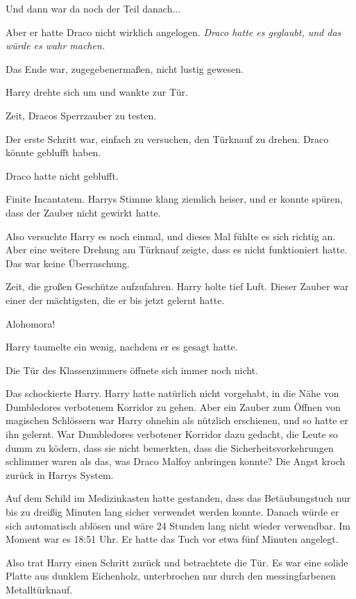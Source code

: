 Und dann war da noch der Teil danach...

Aber er hatte Draco nicht wirklich angelogen. \emph{Draco hatte es geglaubt, und
das würde es wahr machen.}

Das Ende war, zugegebenermaßen, nicht lustig gewesen.

Harry drehte sich um und wankte zur Tür.

Zeit, Dracos Sperrzauber zu testen.

Der erste Schritt war, einfach zu versuchen, den Türknauf zu drehen. Draco
könnte geblufft haben.

Draco hatte nicht geblufft.

\glqq{}Finite Incantatem.\grqq{} Harrys Stimme klang ziemlich heiser, und er
konnte spüren, dass der Zauber nicht gewirkt hatte.

Also versuchte Harry es noch einmal, und dieses Mal fühlte es sich richtig an.
Aber eine weitere Drehung am Türknauf zeigte, dass es nicht funktioniert hatte.
Das war keine Überraschung.

Zeit, die großen Geschütze aufzufahren. Harry holte tief Luft. Dieser Zauber war
einer der mächtigsten, die er bis jetzt gelernt hatte.

\glqq{}Alohomora!\grqq{}

Harry taumelte ein wenig, nachdem er es gesagt hatte.

Die Tür des Klassenzimmers öffnete sich immer noch nicht.

Das schockierte Harry. Harry hatte natürlich nicht vorgehabt, in die Nähe von
Dumbledores verbotenem Korridor zu gehen. Aber ein Zauber zum Öffnen von
magischen Schlössern war Harry ohnehin als nützlich erschienen, und so hatte er
ihn gelernt. War Dumbledores verbotener Korridor dazu gedacht, die Leute so dumm
zu ködern, dass sie nicht bemerkten, dass die Sicherheitsvorkehrungen schlimmer
waren als das, was Draco Malfoy anbringen konnte? Die Angst kroch zurück in
Harrys System.

Auf dem Schild im Medizinkasten hatte gestanden, dass das Betäubungstuch nur bis
zu dreißig Minuten lang sicher verwendet werden konnte. Danach würde er sich
automatisch ablösen und wäre 24 Stunden lang nicht wieder verwendbar. Im Moment
war es 18:51 Uhr. Er hatte das Tuch vor etwa fünf Minuten angelegt.

Also trat Harry einen Schritt zurück und betrachtete die Tür. Es war eine solide
Platte aus dunklem Eichenholz, unterbrochen nur durch den messingfarbenen
Metalltürknauf.

